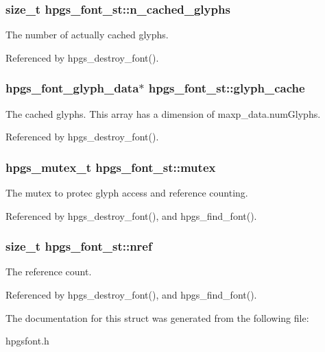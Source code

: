 \subsubsection[n\_\-cached\_\-glyphs]{\setlength{\rightskip}{0pt plus 5cm}size\_\-t {\bf hpgs\_\-font\_\-st::n\_\-cached\_\-glyphs}}\label{structhpgs__font__st_2d8d4de9fb54a237d12221e93da80ee8}


The number of actually cached glyphs. 

Referenced by hpgs\_\-destroy\_\-font().
\subsubsection[glyph\_\-cache]{\setlength{\rightskip}{0pt plus 5cm}hpgs\_\-font\_\-glyph\_\-data$\ast$ {\bf hpgs\_\-font\_\-st::glyph\_\-cache}}\label{structhpgs__font__st_91fa96300139ac68055d5381f21cd2f9}


The cached glyphs. This array has a dimension of maxp\_\-data.numGlyphs. 

Referenced by hpgs\_\-destroy\_\-font().
\subsubsection[mutex]{\setlength{\rightskip}{0pt plus 5cm}hpgs\_\-mutex\_\-t {\bf hpgs\_\-font\_\-st::mutex}}\label{structhpgs__font__st_c38d24f9286f4d3b46a38a5b1500e541}


The mutex to protec glyph access and reference counting. 

Referenced by hpgs\_\-destroy\_\-font(), and hpgs\_\-find\_\-font().
\subsubsection[nref]{\setlength{\rightskip}{0pt plus 5cm}size\_\-t {\bf hpgs\_\-font\_\-st::nref}}\label{structhpgs__font__st_62615189edb7935d10248a065caae62b}


The reference count. 

Referenced by hpgs\_\-destroy\_\-font(), and hpgs\_\-find\_\-font().

The documentation for this struct was generated from the following file:\begin{CompactItemize}
\item 
hpgsfont.h\end{CompactItemize}
